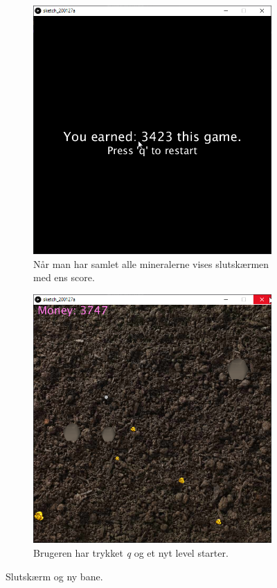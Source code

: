 \documentclass[12pt,a4paper]{article}
\begin{document}
    \begin{figure}[H]
        \begin{subfigure}{.5\textwidth}
            \centering
            \includegraphics[width=.98\linewidth]{5.png}
            \caption{Når man har samlet alle mineralerne vises slutskærmen med ens score.}
        \end{subfigure}
        \begin{subfigure}{.5\textwidth}
            \centering
            \includegraphics[width=.98\linewidth]{6.png}
            \caption{Brugeren har trykket \emph{q} og et nyt level starter.}
        \end{subfigure}
        \caption{Slutskærm og ny bane.}
    \end{figure}
\end{document}
